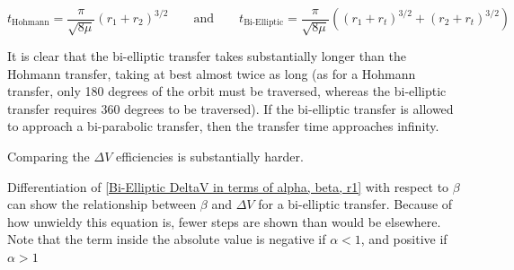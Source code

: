 \documentclass{article}
\begin{document}
$$t_\text{Hohmann}=\frac{\pi}{\sqrt{8\mu}}(r_1+r_2)^{3/2}\qquad\text{and}\qquad t_\text{Bi-Elliptic}=\frac{\pi}{\sqrt{8\mu}}\left((r_1+r_t)^{3/2}+(r_2+r_t)^{3/2}\right)$$

It is clear that the bi-elliptic transfer takes substantially longer than the Hohmann transfer, taking at best almost twice as long (as for a Hohmann transfer, only 180 degrees of the orbit must be traversed, whereas the bi-elliptic transfer requires 360 degrees to be traversed). If the bi-elliptic transfer is allowed to approach a bi-parabolic transfer, then the transfer time approaches infinity.

Comparing the $\Delta V$ efficiencies is substantially harder.

Differentiation of \eqref{Bi-Elliptic DeltaV in terms of alpha, beta, r1} with respect to $\beta$ can show the relationship between $\beta$ and $\Delta V$ for a bi-elliptic transfer. Because of how unwieldy this equation is, fewer steps are shown than would be elsewhere. Note that the term inside the absolute value is negative if $\alpha<1$, and positive if $\alpha>1$


\end{document}
